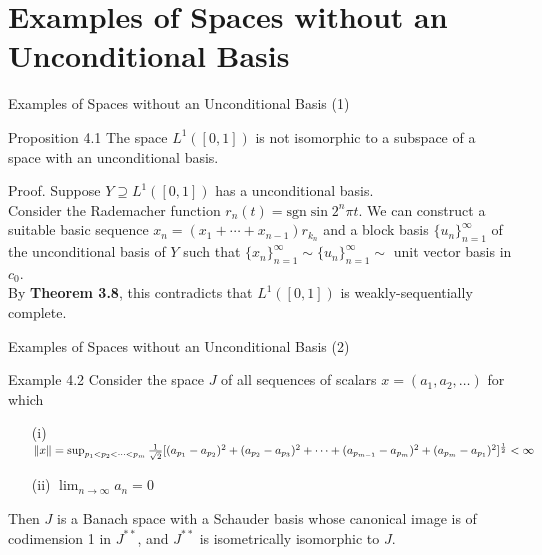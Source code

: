 \documentclass{beamer}
\begin{document}
\section{Examples of Spaces without an Unconditional Basis}
\begin{frame}{Examples of Spaces without an Unconditional Basis (1)}
    \begin{block}{Proposition 4.1}
        The space $L^1([0,1])$ is not isomorphic to a subspace of a space with an unconditional basis.
    \end{block}
    Proof. Suppose $Y\supseteq L^1([0,1])$ has a unconditional basis.\\
    Consider the Rademacher function $r_n(t)=\text{sgn}\sin 2^n\pi t$. We can construct a suitable basic sequence $x_n=(x_1+\cdots+x_{n-1})r_{k_n}$ and a block basis $\{u_n\}_{n=1}^\infty$
    of the unconditional basis of $Y$ such that $\{x_n\}_{n=1}^\infty\sim\{u_n\}_{n=1}^\infty\sim$ unit vector basis in $c_0$.\\
    By \textbf{Theorem 3.8}, this contradicts that $L^1([0,1])$ is weakly-sequentially complete.
\end{frame}
\begin{frame}{Examples of Spaces without an Unconditional Basis (2)}
    \begin{block}{Example 4.2}
        Consider the space $J$ of all sequences of scalars $x=(a_1,a_2,\ldots)$ for which
    	\begin{itemize}
    		\item[(i)] $\left\lVert x \right\rVert=\sup_{p_1<p_2<\cdots<p_m}\frac1{\sqrt2}[(a_{p_1}-a_{p_2})^2+(a_{p_2}-a_{p_3})^2+\cdots
    		+(a_{p_{m-1}}-a_{p_m})^2+(a_{p_m}-a_{p_1})^2]^{\frac12}<\infty$
    		\item[(ii)] $\lim_{n\to\infty}a_n=0$
    	\end{itemize}
    	Then $J$ is a Banach space with a Schauder basis whose canonical image is of codimension 1 in $J^{**}$,
        and $J^{**}$ is isometrically isomorphic to $J$.
    \end{block}
\end{frame}
\end{document}
